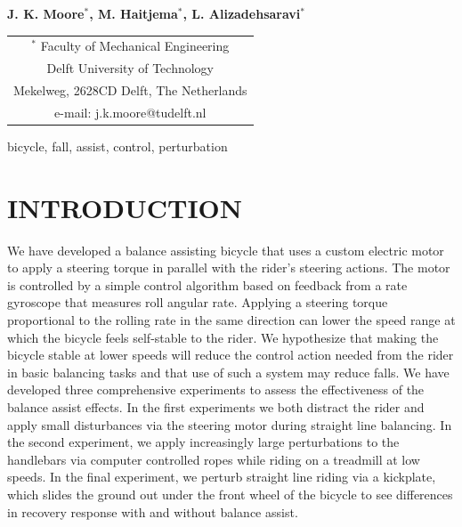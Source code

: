 \documentclass{icsc}
\begin{document}
\begin{center}
\end{center}

\begin{center}
  \normalsize{\bf{J. K. Moore$^{*}$,
                  M. Haitjema$^{*}$,
                  L. Alizadehsaravi$^{*}$}}
\end{center}

\begin{center}
  \begin{tabular}{c}
    $^*$ Faculty of Mechanical Engineering\\
    Delft University of Technology\\
    Mekelweg, 2628CD Delft, The Netherlands\\
    e-mail: j.k.moore@tudelft.nl\\
  \end{tabular}
\end{center}

\begin{keywords}
  bicycle,
  fall,
  assist,
  control,
  perturbation
\end{keywords}

\section{INTRODUCTION}
%
We have developed a balance assisting bicycle that uses a custom electric motor
to apply a steering torque in parallel with the rider's steering actions. The
motor is controlled by a simple control algorithm based on feedback from a rate
gyroscope that measures roll angular rate. Applying a steering torque
proportional to the rolling rate in the same direction can lower the speed
range at which the bicycle feels self-stable to the rider. We hypothesize that
making the bicycle stable at lower speeds will reduce the control action needed
from the rider in basic balancing tasks and that use of such a system may
reduce falls. We have developed three comprehensive experiments to assess the
effectiveness of the balance assist effects. In the first experiments we both
distract the rider and apply small disturbances via the steering motor during
straight line balancing. In the second experiment, we apply increasingly large
perturbations to the handlebars via computer controlled ropes while riding on a
treadmill at low speeds. In the final experiment, we perturb straight line
riding via a kickplate, which slides the ground out under the front wheel of
the bicycle to see differences in recovery response with and without balance
assist.
\end{document}
